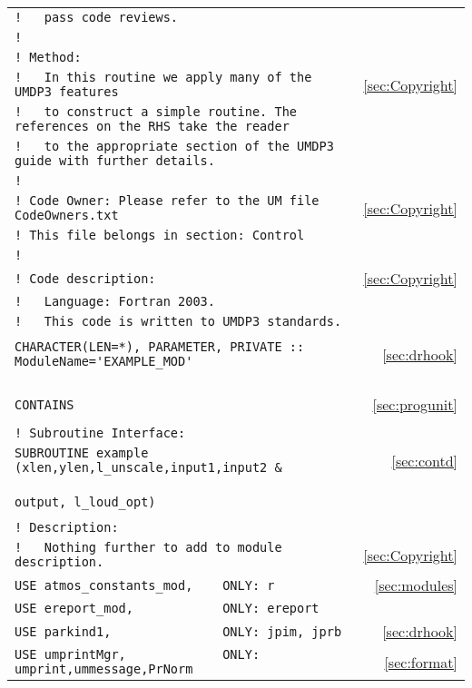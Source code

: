 \begin{longtable}{lr}
\verb|!   pass code reviews. | & \\  
\verb|! | & \\
\verb|! Method:| & \\  
\verb|!   In this routine we apply many of the UMDP3 features| & \ref{sec:Copyright}\\  
\verb|!   to construct a simple routine. The references on the RHS take the reader| & \\ 
\verb|!   to the appropriate section of the UMDP3 guide with further details.  | & \\ 
\verb|!| & \\  
\verb|! Code Owner: Please refer to the UM file CodeOwners.txt| & \ref{sec:Copyright}\\  
\verb|! This file belongs in section: Control | & \\  
\verb|!| & \\  
\verb|! Code description:| & \ref{sec:Copyright}\\  
\verb|!   Language: Fortran 2003.| & \\  
\verb|!   This code is written to UMDP3 standards.| & \\  
\verb|| & \\  
\verb|CHARACTER(LEN=*), PARAMETER, PRIVATE :: ModuleName='EXAMPLE_MOD' | & \ref{sec:drhook} \\
\verb| | & \\
\verb|CONTAINS| & \ref{sec:progunit}\\  
\verb|| & \\  
\verb|! Subroutine Interface:| & \\  
\verb|SUBROUTINE example (xlen,ylen,l_unscale,input1,input2 &  |     & \ref{sec:contd}\\
\verb|                                       output, l_loud_opt) |  \\  
\verb|| & \\  
\verb|! Description:| & \\  
\verb|!   Nothing further to add to module description.  | & \ref{sec:Copyright}\\  
\verb|USE atmos_constants_mod,    ONLY: r                | & \ref{sec:modules}\\
\verb|USE ereport_mod,            ONLY: ereport          | & \\
\verb|USE parkind1,               ONLY: jpim, jprb       | & \ref{sec:drhook}\\ 
\verb|USE umprintMgr,             ONLY: umprint,ummessage,PrNorm | &  \ref{sec:format}\\

\end{longtable}
